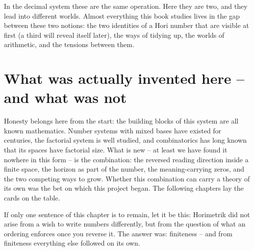 In the decimal system these are the same operation. Here they are
two, and they lead into different worlds. Almost everything this
book studies lives in the gap between these two notions: the two
identities of a Hori number that are visible at first (a third will
reveal itself later), the ways of tidying up, the worlds of
arithmetic, and the tensions between them.

\section{What was actually invented here -- and what was not}

Honesty belongs here from the start: the building blocks of this
system are all known mathematics. Number systems with mixed bases
have existed for centuries, the factorial system is well studied,
and combinatorics has long known that its spaces have factorial
size. What is new -- at least we have found it nowhere in this form
-- is the combination: the reversed reading direction inside a
finite space, the horizon as part of the number, the
meaning-carrying zeros, and the two competing ways to grow. Whether
this combination can carry a theory of its own was the bet on which
this project began. The following chapters lay the cards on the
table.

\begin{oberflaeche}
If only one sentence of this chapter is to remain, let it be this:
Horimetrik did not arise from a wish to write numbers differently,
but from the question of what an ordering enforces once you reverse
it. The answer was: finiteness -- and from finiteness everything
else followed on its own.
\end{oberflaeche}
